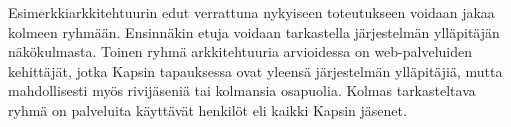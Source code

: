 Esimerkkiarkkitehtuurin edut verrattuna nykyiseen toteutukseen voidaan jakaa kolmeen ryhmään. Ensinnäkin etuja voidaan tarkastella järjestelmän ylläpitäjän näkökulmasta. Toinen ryhmä arkkitehtuuria arvioidessa on web-palveluiden kehittäjät, jotka Kapsin tapauksessa ovat yleensä järjestelmän ylläpitäjiä, mutta mahdollisesti myös rivijäseniä tai kolmansia osapuolia. Kolmas tarkasteltava ryhmä on palveluita käyttävät henkilöt eli kaikki Kapsin jäsenet.